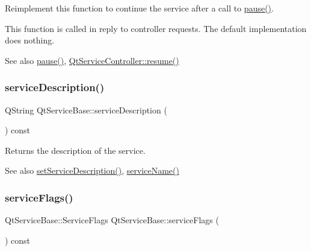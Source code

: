 Reimplement this function to continue the service after a call to \hyperlink{class_qt_service_base_a43215a7c5c047d30bcf4f697e6691f89}{pause()}.

This function is called in reply to controller requests. The default implementation does nothing.

\begin{DoxySeeAlso}{See also}
\hyperlink{class_qt_service_base_a43215a7c5c047d30bcf4f697e6691f89}{pause()}, \hyperlink{class_qt_service_controller_a2d71eab6146427fc7b431386bf72eaec}{Qt\+Service\+Controller\+::resume()} 
\end{DoxySeeAlso}
\mbox{\label{class_qt_service_base_a6cf3ef7bc5d85acb31e99a85fde47397}} 
\subsubsection{\texorpdfstring{service\+Description()}{serviceDescription()}}
{\footnotesize\ttfamily Q\+String Qt\+Service\+Base\+::service\+Description (\begin{DoxyParamCaption}{ }\end{DoxyParamCaption}) const}

Returns the description of the service.

\begin{DoxySeeAlso}{See also}
\hyperlink{class_qt_service_base_a09d7547436c65a900f18c58b2a650286}{set\+Service\+Description()}, \hyperlink{class_qt_service_base_a643f253b3931e6a6c4e8caa190756214}{service\+Name()} 
\end{DoxySeeAlso}
\mbox{\label{class_qt_service_base_aab0b204981c481e098fe72061e3f367a}} 
\subsubsection{\texorpdfstring{service\+Flags()}{serviceFlags()}}
{\footnotesize\ttfamily Qt\+Service\+Base\+::\+Service\+Flags Qt\+Service\+Base\+::service\+Flags (\begin{DoxyParamCaption}{ }\end{DoxyParamCaption}) const}

